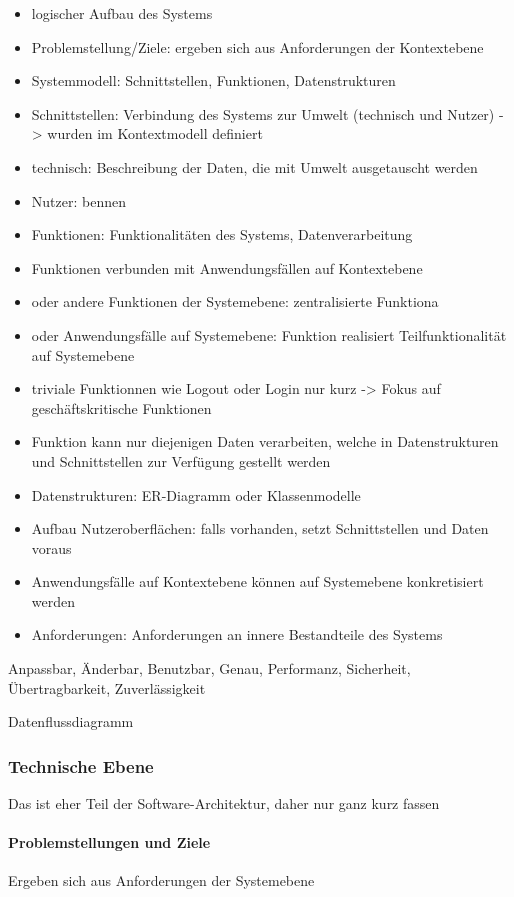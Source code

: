 \begin{itemize}
  \item logischer Aufbau des Systems
  \item Problemstellung/Ziele: ergeben sich aus Anforderungen der Kontextebene
  \item Systemmodell: Schnittstellen, Funktionen, Datenstrukturen
  \item Schnittstellen: Verbindung des Systems zur Umwelt (technisch und Nutzer) -> wurden im Kontextmodell definiert
  \item technisch: Beschreibung der Daten, die mit Umwelt ausgetauscht werden
  \item Nutzer: bennen
  \item Funktionen: Funktionalitäten des Systems, Datenverarbeitung
  \item Funktionen verbunden mit Anwendungsfällen auf Kontextebene
  \item oder andere Funktionen der Systemebene: zentralisierte Funktiona
  \item oder Anwendungsfälle auf Systemebene: Funktion realisiert Teilfunktionalität auf Systemebene
  \item triviale Funktionnen wie Logout oder Login nur kurz -> Fokus auf geschäftskritische Funktionen
  \item Funktion kann nur diejenigen Daten verarbeiten, welche in Datenstrukturen und Schnittstellen zur Verfügung gestellt werden
  \item Datenstrukturen: ER-Diagramm oder Klassenmodelle
  \item Aufbau Nutzeroberflächen: falls vorhanden, setzt Schnittstellen und Daten voraus
  \item Anwendungsfälle auf Kontextebene können auf Systemebene konkretisiert werden
  \item Anforderungen: Anforderungen an innere Bestandteile des Systems
\end{itemize}
Anpassbar, Änderbar, Benutzbar, Genau, Performanz, Sicherheit, Übertragbarkeit, Zuverlässigkeit

Datenflussdiagramm

\subsubsection{Technische Ebene}
Das ist eher Teil der Software-Architektur, daher nur ganz kurz fassen

\paragraph{Problemstellungen und Ziele}
Ergeben sich aus Anforderungen der Systemebene

